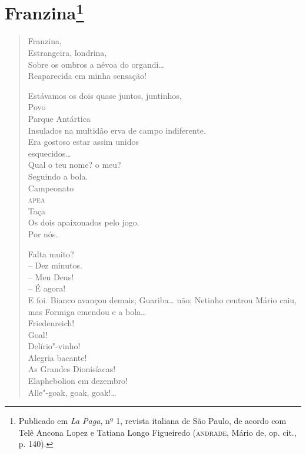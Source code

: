 {\chapter[Franzina]{Franzina\footnote[*]{Publicado em \emph{La Paga}, nº 1, revista
  italiana de São Paulo, de acordo com Telê Ancona Lopez e Tatiana Longo
  Figueiredo (\textsc{andrade}, Mário de, op. cit., p. 140).}}

\begin{verse}
Franzina,\\
Estrangeira, londrina,\\
Sobre os ombros a névoa do organdi\ldots{}\\
Reaparecida em minha sensação!

Estávamos os dois quase juntos, juntinhos,\\
\qquad\quad Povo\\
\qquad\quad Parque Antártica\\
Insulados na multidão erva de campo indiferente.\\
Era gostoso estar assim unidos\\
\qquad\qquad\qquad\qquad\qquad\qquad esquecidos\ldots{}\\
Qual o teu nome? o meu?\\
Seguindo a bola.\\
\qquad\qquad\qquad Campeonato\\
\qquad\qquad\quad\textsc{apea}\\
\qquad\qquad Taça\\
Os dois apaixonados pelo jogo.\\
\qquad\qquad\qquad\qquad\qquad Por nós.

Falta muito?\\
-- Dez minutos.\\
-- Meu Deus!\\
-- É agora!\\
E foi. Bianco avançou demais; Guariba\ldots{} não; Netinho centrou Mário caiu, mas Formiga emendou e a bola\ldots{}\\
\quad\quad\quad\quad\quad\quad{}Friedenreich!\\
\quad\quad\quad\quad\quad{}Goal!\\
\quad\quad\quad\quad{}Delírio"-vinho!\\
\quad\quad\quad{}Alegria bacante!\\
\quad\quad{}As Grandes Dionisíacas!\\
\quad{}Elaphebolion em dezembro!\\
Alle"-goak, goak, goak!\ldots{}


\end{verse}}
